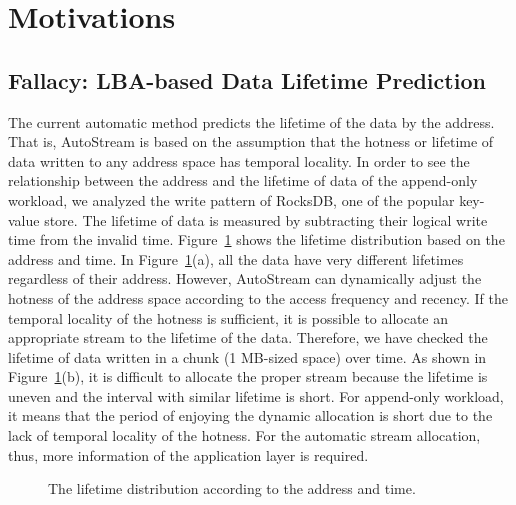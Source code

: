 \section{Motivations}
\subsection{Fallacy: LBA-based Data Lifetime Prediction}
The current automatic method predicts the lifetime of the data by the address.
That is, AutoStream is based on the assumption that the hotness or lifetime of data 
written to any address space has temporal locality.
In order to see the relationship between the address and the lifetime of data of the append-only workload,
we analyzed the write pattern of RocksDB, one of the popular key-value store.
The lifetime of data is measured by subtracting their logical write time from the invalid time.
Figure~\ref{fig:lba_lifetime} shows the lifetime distribution based on the address and time.
In Figure~\ref{fig:lba_lifetime}(a), all the data have very different lifetimes regardless of their 
address.
However, AutoStream can dynamically adjust the hotness of the address space
according to the access frequency and recency.
If the temporal locality of the hotness is sufficient, 
it is possible to allocate an appropriate stream to the lifetime of the data.
Therefore, we have checked the lifetime of data written in a chunk (1 MB-sized space) over time.
As shown in Figure~\ref{fig:lba_lifetime}(b), it is difficult to allocate the proper stream 
because the lifetime is uneven and the interval with similar lifetime is short.
For append-only workload, it means that the period of enjoying the dynamic allocation is short 
due to the lack of temporal locality of the hotness.
For the automatic stream allocation, thus, more information of the application layer is required.

\begin{figure}[t]
	\centering
	\vspace{-10pt}
	\caption{The lifetime distribution according to the address and time.}
	\label{fig:lba_lifetime}
	\vspace{-15pt}
\end{figure}

